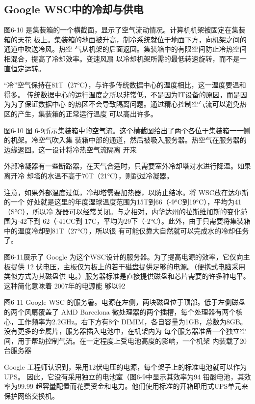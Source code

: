 \subsection{Google WSC中的冷却与供电}
图6-10 是集装箱的一个横截面，显示了空气流动情况。计算机机架被固定在集装箱的天花
板上。集装箱的地面被升高，制冷系统就位于地面下方，向机架之间的通道中吹送冷风。热空
气从机架的后面返回。集装箱中的有限空间防止冷热空间相混合，提高了冷却效率。变速风扇
以冷却机架所需的最低转速旋转，而不是一直恒定运转。

“冷”空气保持在81T（27°C），与许多传统数据中心的温度相比，这一温度要温和得多。
传统数据中心的运行温度之所以非常低，不是因为IT设备的原因，而是因为为了保证数据中心
的热区不会导致隔离问题。通过精心控制空气流可以避免热区的产生，集装箱的正常运行温度
可以高出许多。

图6-10
图 6-9所示集装箱中的空气流。这个横截图给出了两个各位于集装箱一一侧的机架。冷空气吹入集
装箱中部的通道，然后被吸入服务器。热空气在服务器的边缘返回。这一设计将冷热空气流隔离
开来

外部冷凝器有一些断路器，在天气合适时，只需要室外冷却塔对水进行降温。如果离开冷
却塔的水温不高于70T（21°C），则跳过冷凝器。

注意，如果外部温度过低，冷却塔需要加热器，以防止结冰。将 WSC放在达尔斯的一个
好处就是这里的年度湿球温度范围为15T到66（-9°C到19°C），平均为41（S°C），所以冷
凝器可以经常关闭。与之相对，内华达州的拉斯维加斯的变化范围为-42下到 62（-41CC到
17C，平均为29下（-2°C）。此外，由于只需要将集装箱中的温度冷却到81T（27°C），所以很
有可能仅靠大自然就可以完成水的冷却任务了。

图6-11展示了 Google 为这个WSC设计的服务器。为了提高电源的效率，它仅向主板提供
12 伏电压，主板仅为板上的若干磁盘提供足够的电源。（便携式电脑采用类似方式为其磁盘供
电。）服务器标准是直接提供磁盘和芯片需要的许多种电平。这种简化意味着 2007年的电源能
够以92%

图6-11 Google WSC 的服务暑。电源在左侧，两块磁盘位于顶部。低于左側磁盘的两个风扇覆盖了 AMD
Barcelona 微处理器的两个插槽，每个处理器有两个核心，工作频率为2.2GHz。右下方有8个
DIMIM，各自容量为1GB，总数为8GB。没有更多的金属片，服务器插入电池中，在机架内为
每个服务器准备一个独立空间，用于帮助控制气流。在一定程度上受电池高度的影响，一个机架
内装载了20台服务器

Google 工程师认识到，采用12伏电压的电源，每个架子上的标准电池就可以作为UPS。
因此，它没有采用独立的电池室（图6-9中显示其效率为94%
铅酸电池，其效率为99.99%
超容量配置而花费资金和电力。他们使用标准的开箱即用式UPS单元来保护网络交换机。

